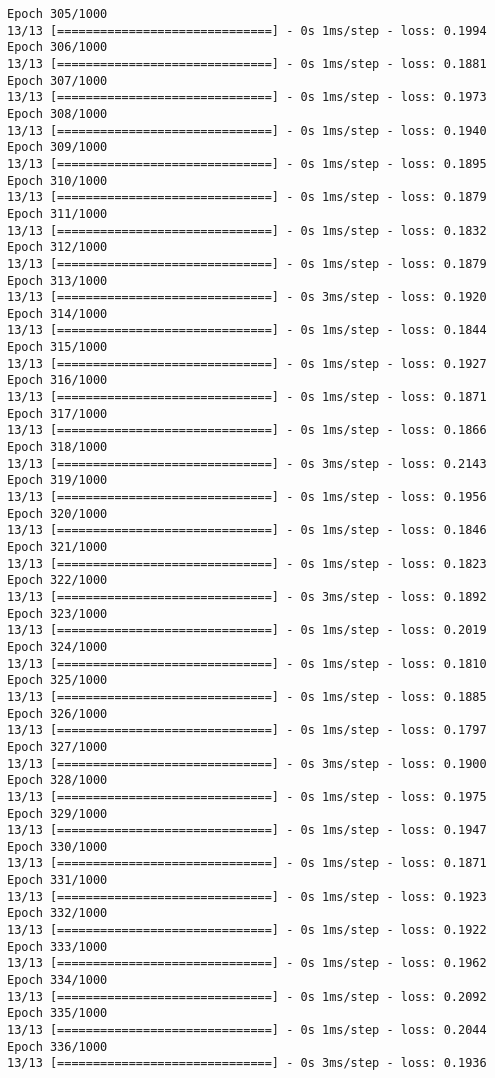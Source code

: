 \documentclass[11pt]{article}
\begin{document}
\begin{Verbatim}[commandchars=\\\{\}]
Epoch 305/1000
13/13 [==============================] - 0s 1ms/step - loss: 0.1994
Epoch 306/1000
13/13 [==============================] - 0s 1ms/step - loss: 0.1881
Epoch 307/1000
13/13 [==============================] - 0s 1ms/step - loss: 0.1973
Epoch 308/1000
13/13 [==============================] - 0s 1ms/step - loss: 0.1940
Epoch 309/1000
13/13 [==============================] - 0s 1ms/step - loss: 0.1895
Epoch 310/1000
13/13 [==============================] - 0s 1ms/step - loss: 0.1879
Epoch 311/1000
13/13 [==============================] - 0s 1ms/step - loss: 0.1832
Epoch 312/1000
13/13 [==============================] - 0s 1ms/step - loss: 0.1879
Epoch 313/1000
13/13 [==============================] - 0s 3ms/step - loss: 0.1920
Epoch 314/1000
13/13 [==============================] - 0s 1ms/step - loss: 0.1844
Epoch 315/1000
13/13 [==============================] - 0s 1ms/step - loss: 0.1927
Epoch 316/1000
13/13 [==============================] - 0s 1ms/step - loss: 0.1871
Epoch 317/1000
13/13 [==============================] - 0s 1ms/step - loss: 0.1866
Epoch 318/1000
13/13 [==============================] - 0s 3ms/step - loss: 0.2143
Epoch 319/1000
13/13 [==============================] - 0s 1ms/step - loss: 0.1956
Epoch 320/1000
13/13 [==============================] - 0s 1ms/step - loss: 0.1846
Epoch 321/1000
13/13 [==============================] - 0s 1ms/step - loss: 0.1823
Epoch 322/1000
13/13 [==============================] - 0s 3ms/step - loss: 0.1892
Epoch 323/1000
13/13 [==============================] - 0s 1ms/step - loss: 0.2019
Epoch 324/1000
13/13 [==============================] - 0s 1ms/step - loss: 0.1810
Epoch 325/1000
13/13 [==============================] - 0s 1ms/step - loss: 0.1885
Epoch 326/1000
13/13 [==============================] - 0s 1ms/step - loss: 0.1797
Epoch 327/1000
13/13 [==============================] - 0s 3ms/step - loss: 0.1900
Epoch 328/1000
13/13 [==============================] - 0s 1ms/step - loss: 0.1975
Epoch 329/1000
13/13 [==============================] - 0s 1ms/step - loss: 0.1947
Epoch 330/1000
13/13 [==============================] - 0s 1ms/step - loss: 0.1871
Epoch 331/1000
13/13 [==============================] - 0s 1ms/step - loss: 0.1923
Epoch 332/1000
13/13 [==============================] - 0s 1ms/step - loss: 0.1922
Epoch 333/1000
13/13 [==============================] - 0s 1ms/step - loss: 0.1962
Epoch 334/1000
13/13 [==============================] - 0s 1ms/step - loss: 0.2092
Epoch 335/1000
13/13 [==============================] - 0s 1ms/step - loss: 0.2044
Epoch 336/1000
13/13 [==============================] - 0s 3ms/step - loss: 0.1936

\end{Verbatim}
\end{document}
